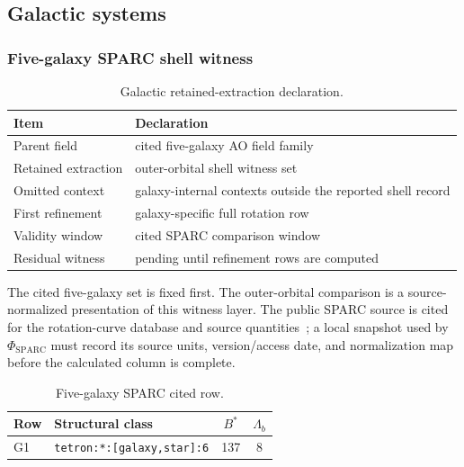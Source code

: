 \subsection{Galactic systems}

\subsubsection{Five-galaxy SPARC shell witness}
\label{man:five-galaxy-sparc-witness}

\begin{table}[H]
\centering
\caption{Galactic retained-extraction declaration.}
\label{tab:galactic-retention}
\begin{threeparttable}
\begin{tabularx}{\linewidth}{@{}lX@{}}
\toprule
Item & Declaration \\
\midrule
Parent field & cited five-galaxy AO field family \\
Retained extraction & outer-orbital shell witness set \\
Omitted context & galaxy-internal contexts outside the reported shell record \\
First refinement & galaxy-specific full rotation row \\
Validity window & cited SPARC comparison window \\
Residual witness & pending until refinement rows are computed \\
\bottomrule
\end{tabularx}
\end{threeparttable}
\end{table}

The cited five-galaxy set is fixed first. The outer-orbital comparison is a source-normalized presentation of this witness layer. The public SPARC source is cited for the rotation-curve database and source quantities~\cite{sparc_paper,sparc_site}; a local snapshot used by \(\Phi_{\mathrm{SPARC}}\) must record its source units, version/access date, and normalization map before the calculated column is complete.

\begin{table}[H]
\centering
\caption{Five-galaxy SPARC cited row.}
\label{tab:five-galaxy-row}
\begin{threeparttable}
\small
\begin{tabularx}{\linewidth}{@{}lXcc@{}}
\toprule
Row & Structural class & $B^*$ & $\Lambda_b$ \\
\midrule
G1 & \texttt{tetron:*:[galaxy,star]:6} & 137 & 8 \\
\bottomrule
\end{tabularx}
\end{threeparttable}
\end{table}

